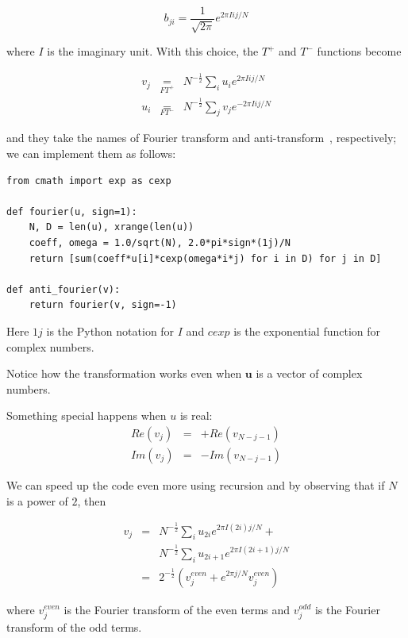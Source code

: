 \documentclass[justified,sixbynine]{tufte-book}
\def\stackunder#1#2{\mathrel{\mathop{#2}\limits_{#1}}}
\theoremstyle{plain}%
\theoremstyle{definition}
\theoremstyle{remark}
\begin{document}
\begin{fullwidth}
\begin{equation}
b_{ji} = \frac{1}{\sqrt{2\pi}} e^{2\pi I ij/N}
\end{equation}

where $I$ is the imaginary unit. With this choice, the $T^+$ and $T^-$ functions become

\begin{eqnarray}
v_j &\stackunder{FT^+}{=}& N^{-\frac12} \sum_i u_i e^{2\pi I ij/N} \\
\label{fourierd1}
u_i &\stackunder{FT^-}{=}& N^{-\frac12} \sum_j v_j e^{-2\pi I ij/N}
\label{fourierd2}
\end{eqnarray}

and they take the names of Fourier transform and anti-transform~\cite{fourier}, respectively;
we can implement them as follows:

\begin{lstlisting}
from cmath import exp as cexp

def fourier(u, sign=1):
    N, D = len(u), xrange(len(u))
    coeff, omega = 1.0/sqrt(N), 2.0*pi*sign*(1j)/N
    return [sum(coeff*u[i]*cexp(omega*i*j) for i in D) for j in D]

def anti_fourier(v):
    return fourier(v, sign=-1)
\end{lstlisting}

Here $1j$ is the Python notation for $I$ and $cexp$ is the exponential function for complex numbers.

Notice how the transformation works even when $\mathbf{u}$ is a vector of complex numbers.

Something special happens when $u$ is real:
\begin{eqnarray}
Re(v_j) &=& +Re(v_{N-j-1}) \\
Im(v_j) &=& -Im(v_{N-j-1})
\end{eqnarray}

We can speed up the code even more using recursion and by observing that if $N$ is a power of $2$, then

\begin{eqnarray}
v_j &=& N^{-\frac12} \sum_i u_{2i} e^{2\pi I (2i)j/N} + \\
             &&  N^{-\frac12} \sum_i u_{2i+1} e^{2\pi I (2i+1)j/N} \\
             &=& 2^{-\frac12} ( v_j^{even} + e^{2\pi j/N} v_j^{even} )
\end{eqnarray}

where $v_j^{even}$ is the Fourier transform of the even terms and $v_j^{odd}$ is the Fourier transform of the odd terms.


\end{fullwidth}
\end{document}
